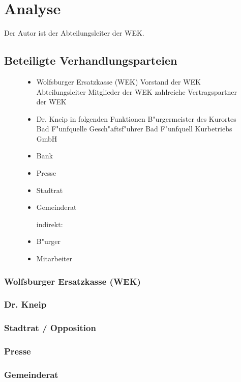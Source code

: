 \chapter{Analyse}
Der Autor ist der Abteilungsleiter der WEK.

\section{Beteiligte Verhandlungsparteien}

\begin{figure}[htbp]
	
	\begin{itemize}
	\item Wolfsburger Ersatzkasse (WEK)
    \subitem Vorstand der WEK
    \subitem Abteilungsleiter
	\subitem Mitglieder der WEK
	\subitem zahlreiche Vertragspartner der WEK
    
	\item Dr. Kneip in folgenden Funktionen
	\subitem B"urgermeister des Kurortes Bad F"unfquelle
	\subitem Gesch"aftsf"uhrer Bad F"unfquell Kurbetriebs GmbH
    
    \item Bank
    \item Presse
    \item Stadtrat
	\item Gemeinderat 
    
    indirekt:
	\item B"urger	
	\item Mitarbeiter
	
	\end{itemize}
\end{figure}


\subsection{Wolfsburger Ersatzkasse (WEK)}
\subsection{Dr. Kneip}
\subsection{Stadtrat / Opposition}
\subsection{Presse}
\subsection{Gemeinderat}
